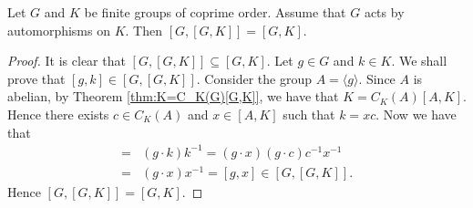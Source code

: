 \begin{corollary}\label{cor:coprimeaction}
Let $G$ and $K$ be finite groups of coprime order. Assume that $G$ acts by automorphisms on $K$. Then $[G,[G,K]]=[G,K]$.
\end{corollary}

\begin{proof}
    It is clear that $[G,[G,K]]\subseteq [G,K]$. Let $g\in G$ and $k\in K$. We shall prove that $[g,k]\in [G,[G,K]]$. Consider the group $A=\langle g\rangle$. Since $A$ is abelian, by Theorem \ref{thm:K=C_K(G)[G,K]}, we have that $K=C_K(A)[A,K]$. Hence there exists $c\in C_K(A)$ and $x\in [A,K]$ such that $k=xc$. Now we have that
    \begin{align*}
        [g,k]=&(g\cdot k)k^{-1}=(g\cdot x)(g\cdot c)c^{-1}x^{-1}\\
        =&(g\cdot x)x^{-1}=[g,x]\in [G,[G,K]].
    \end{align*}
    Hence $[G,[G,K]]=[G,K]$.
\end{proof}




%
%
%



